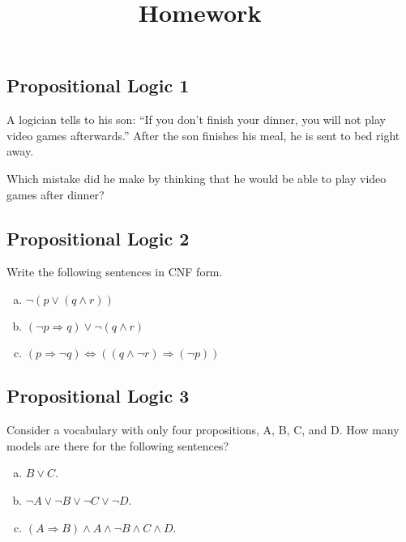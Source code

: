 \documentclass[11pt, answers]{exam}
\title{Homework \hmwkNumber\ \hmwkType}
\date{\hmwkDue}
\begin{document}
\maketitle

%
%
\begin{questions}
\section{Propositional Logic 1}
\question

A logician tells to his son: ``If you don't finish your dinner, you will not play video games afterwards.''
After the son finishes his meal, he is sent to bed right away.

Which mistake did he make by thinking that he would be able to play video games after dinner?

\end{questions}

%
%
\begin{questions}
\section{Propositional Logic 2}
\question

Write the following sentences in CNF form.

\begin{enumerate}[a.]
\item $\neg (p \vee (q \wedge r))$
\item $(\neg p \Rightarrow q) \vee \neg (q \wedge r)$
\item $(p \Rightarrow \neg q) \Leftrightarrow ((q \wedge \neg r) \Rightarrow (\neg p))$
\end{enumerate}

\end{questions}



%
%
\begin{questions}
\section{Propositional Logic 3}
\question

Consider a vocabulary with only four propositions, A, B, C, and D. How many models are there for the following sentences?

\begin{enumerate}[a.]
	\item $B \vee C$.
	\item $\neg A\vee \neg B\vee \neg C\vee \neg D$.
	\item $(A\Rightarrow B)\wedge A\wedge\neg B\wedge C\wedge D$.	
\end{enumerate}

\end{questions}
\end{document}
